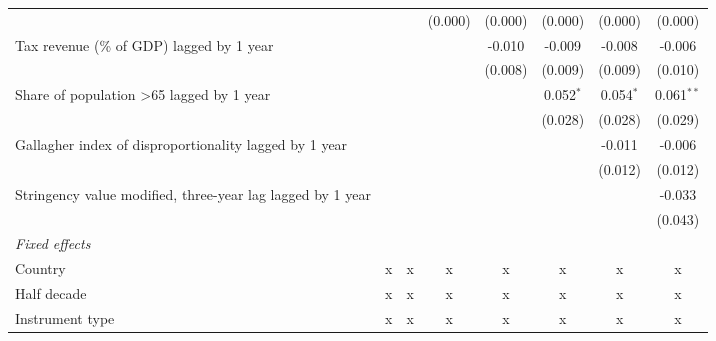\begin{tabular}{lccccccc}
                                                                                  &              &              & (0.000)      & (0.000)      & (0.000)      & (0.000)      & (0.000)\\   
   Tax revenue (\% of GDP) lagged by 1 year                                       &              &              &              & -0.010       & -0.009       & -0.008       & -0.006\\   
                                                                                  &              &              &              & (0.008)      & (0.009)      & (0.009)      & (0.010)\\   
   Share of population >65 lagged by 1 year                                       &              &              &              &              & 0.052$^{*}$  & 0.054$^{*}$  & 0.061$^{**}$\\   
                                                                                  &              &              &              &              & (0.028)      & (0.028)      & (0.029)\\   
   Gallagher index of disproportionality lagged by 1 year                         &              &              &              &              &              & -0.011       & -0.006\\   
                                                                                  &              &              &              &              &              & (0.012)      & (0.012)\\   
   Stringency value modified, three-year lag lagged by 1 year                     &              &              &              &              &              &              & -0.033\\   
                                                                                  &              &              &              &              &              &              & (0.043)\\   
   \emph{Fixed effects}\\
   Country                                                                        & x            & x            & x            & x            & x            & x            & x\\  
   Half decade                                                                    & x            & x            & x            & x            & x            & x            & x\\  
   Instrument type                                                                & x            & x            & x            & x            & x            & x            & x\\  

\end{tabular}
